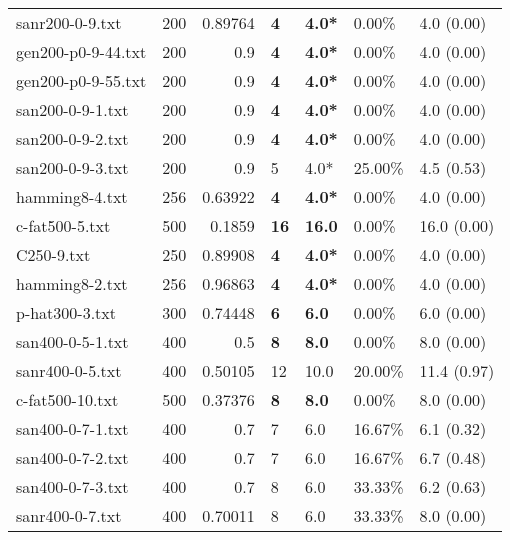 \begin{table}[h]
\begin{tabular}{lrrllll}
 sanr200-0-9.txt    &     200 &     0.89764 & \textbf{4}   & \textbf{4.0*}   & 0.00\%   & 4.0 (0.00)     \\
 gen200-p0-9-44.txt &     200 &     0.9     & \textbf{4}   & \textbf{4.0*}   & 0.00\%   & 4.0 (0.00)     \\
 gen200-p0-9-55.txt &     200 &     0.9     & \textbf{4}   & \textbf{4.0*}   & 0.00\%   & 4.0 (0.00)     \\
 san200-0-9-1.txt   &     200 &     0.9     & \textbf{4}   & \textbf{4.0*}   & 0.00\%   & 4.0 (0.00)     \\
 san200-0-9-2.txt   &     200 &     0.9     & \textbf{4}   & \textbf{4.0*}   & 0.00\%   & 4.0 (0.00)     \\
 san200-0-9-3.txt   &     200 &     0.9     & 5            & 4.0*            & 25.00\%  & 4.5 (0.53)     \\
 hamming8-4.txt     &     256 &     0.63922 & \textbf{4}   & \textbf{4.0*}   & 0.00\%   & 4.0 (0.00)     \\
 c-fat500-5.txt     &     500 &     0.1859  & \textbf{16}  & \textbf{16.0}   & 0.00\%   & 16.0 (0.00)    \\
 C250-9.txt         &     250 &     0.89908 & \textbf{4}   & \textbf{4.0*}   & 0.00\%   & 4.0 (0.00)     \\
 hamming8-2.txt     &     256 &     0.96863 & \textbf{4}   & \textbf{4.0*}   & 0.00\%   & 4.0 (0.00)     \\
 p-hat300-3.txt     &     300 &     0.74448 & \textbf{6}   & \textbf{6.0}    & 0.00\%   & 6.0 (0.00)     \\
 san400-0-5-1.txt   &     400 &     0.5     & \textbf{8}   & \textbf{8.0}    & 0.00\%   & 8.0 (0.00)     \\
 sanr400-0-5.txt    &     400 &     0.50105 & 12           & 10.0            & 20.00\%  & 11.4 (0.97)    \\
 c-fat500-10.txt    &     500 &     0.37376 & \textbf{8}   & \textbf{8.0}    & 0.00\%   & 8.0 (0.00)     \\
 san400-0-7-1.txt   &     400 &     0.7     & 7            & 6.0             & 16.67\%  & 6.1 (0.32)     \\
 san400-0-7-2.txt   &     400 &     0.7     & 7            & 6.0             & 16.67\%  & 6.7 (0.48)     \\
 san400-0-7-3.txt   &     400 &     0.7     & 8            & 6.0             & 33.33\%  & 6.2 (0.63)     \\
 sanr400-0-7.txt    &     400 &     0.70011 & 8            & 6.0             & 33.33\%  & 8.0 (0.00)     \\

\end{tabular}
\end{table}
